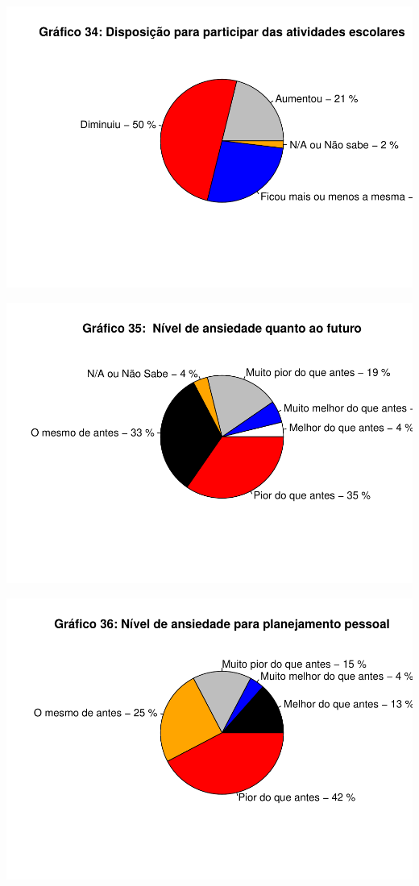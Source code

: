 \documentclass[
]{article}
\begin{document}
\includegraphics{consequencias-oriundas-da-pandemia-v1.0_files/figure-latex/grafico-mana-1.pdf}

\includegraphics{consequencias-oriundas-da-pandemia-v1.0_files/figure-latex/grafico-mona-1.pdf}

\includegraphics{consequencias-oriundas-da-pandemia-v1.0_files/figure-latex/grafico-zumba-1.pdf}
\end{document}
